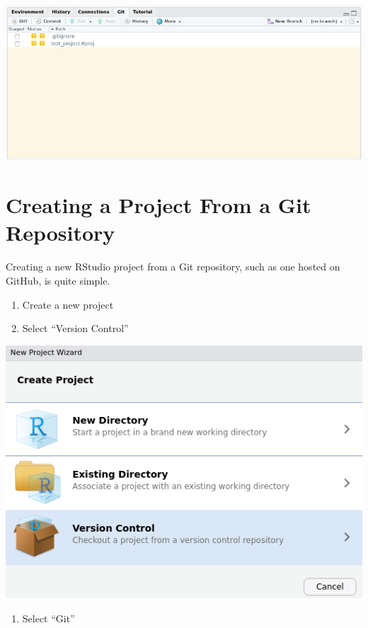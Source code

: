 \documentclass[
]{book}
\providecommand{\tightlist}{%
  \setlength{\itemsep}{0pt}\setlength{\parskip}{0pt}}
\begin{document}
\includegraphics{images/02-newgit_6.png}

\hypertarget{creating-a-project-from-a-git-repository}{%
\section{Creating a Project From a Git Repository}\label{creating-a-project-from-a-git-repository}}

Creating a new RStudio project from a Git repository, such as one hosted on GitHub, is quite simple.

\begin{enumerate}
\def\labelenumi{\arabic{enumi}.}
\tightlist
\item
  Create a new project
\item
  Select ``Version Control''
\end{enumerate}

\includegraphics{images/02-newprojectgit_1.png}

\begin{enumerate}
\def\labelenumi{\arabic{enumi}.}
\setcounter{enumi}{2}
\tightlist
\item
  Select ``Git''
\end{enumerate}
\end{document}
